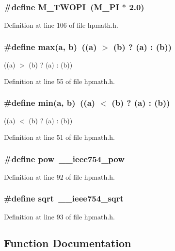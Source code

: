 \subsubsection{\setlength{\rightskip}{0pt plus 5cm}\#define M\_\-TWOPI\ (M\_\-PI $\ast$ 2.0)}\label{hpmath_8h_a16}




Definition at line 106 of file hpmath.h.
\subsubsection{\setlength{\rightskip}{0pt plus 5cm}\#define max(a, b)\ ((a) $>$ (b) ? (a) : (b))}\label{hpmath_8h_a1}


((a) $>$ (b) ? (a) : (b)) 

Definition at line 55 of file hpmath.h.
\subsubsection{\setlength{\rightskip}{0pt plus 5cm}\#define min(a, b)\ ((a) $<$ (b) ? (a) : (b))}\label{hpmath_8h_a0}


((a) $<$ (b) ? (a) : (b)) 

Definition at line 51 of file hpmath.h.
\subsubsection{\setlength{\rightskip}{0pt plus 5cm}\#define pow\ \_\-\_\-ieee754\_\-pow}\label{hpmath_8h_a6}




Definition at line 92 of file hpmath.h.
\subsubsection{\setlength{\rightskip}{0pt plus 5cm}\#define sqrt\ \_\-\_\-ieee754\_\-sqrt}\label{hpmath_8h_a7}




Definition at line 93 of file hpmath.h.

\subsection{Function Documentation}
